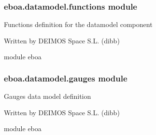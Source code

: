 \subsubsection{eboa.datamodel.functions module}
\label{\detokenize{eboa.datamodel:module-eboa.datamodel.functions}}\label{\detokenize{eboa.datamodel:eboa-datamodel-functions-module}}
Functions definition for the datamodel component

Written by DEIMOS Space S.L. (dibb)

module eboa

\begin{fulllineitems}
\label{\detokenize{eboa.datamodel:eboa.datamodel.functions.get_resources_path}}
\end{fulllineitems}


\begin{fulllineitems}
\label{\detokenize{eboa.datamodel:eboa.datamodel.functions.read_configuration}}
\end{fulllineitems}



\subsubsection{eboa.datamodel.gauges module}
\label{\detokenize{eboa.datamodel:module-eboa.datamodel.gauges}}\label{\detokenize{eboa.datamodel:eboa-datamodel-gauges-module}}
Gauges data model definition

Written by DEIMOS Space S.L. (dibb)

module eboa

